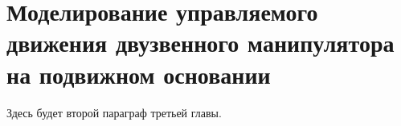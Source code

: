 \section{Моделирование управляемого движения  двузвенного манипулятора на подвижном основании} \label{p32}

Здесь будет второй параграф третьей главы.